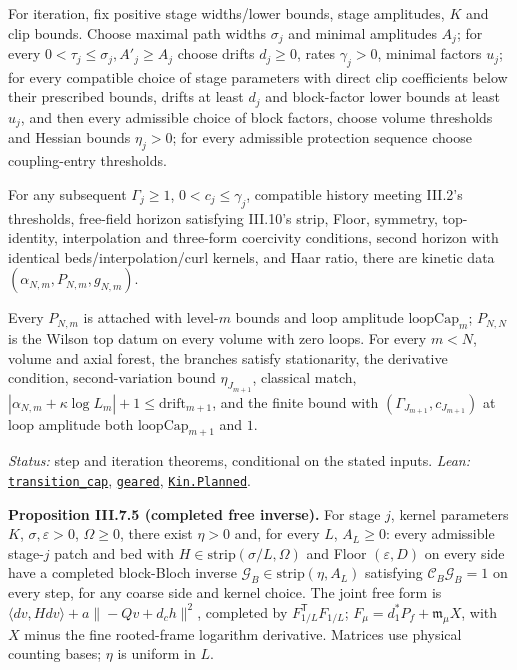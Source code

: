\documentclass[
  letterpaper,
  11pt]{article}
\begin{document}
For iteration, fix positive stage widths/lower bounds, stage amplitudes,
\(K\) and clip bounds. Choose maximal path widths \(\sigma_j\) and
minimal amplitudes \(A_j\); for every
\(0<\tau_j\le\sigma_j,A'_j\ge A_j\) choose drifts \(d_j\ge0\), rates
\(\gamma_j>0\), minimal factors \(u_j\); for every compatible choice of
stage parameters with direct clip coefficients below their prescribed
bounds, drifts at least \(d_j\) and block-factor lower bounds at least
\(u_j\), and then every admissible choice of block factors, choose
volume thresholds and Hessian bounds \(\eta_j>0\); for every admissible
protection sequence choose coupling-entry thresholds.

For any subsequent \(\Gamma_j\ge1\), \(0<c_j\le\gamma_j\), compatible
history meeting III.2's thresholds, free-field horizon satisfying
III.10's strip, Floor, symmetry, top-identity, interpolation and
three-form coercivity conditions, second horizon with identical
beds/interpolation/curl kernels, and Haar ratio, there are kinetic data
\((\alpha_{N,m},P_{N,m},g_{N,m})\).

Every \(P_{N,m}\) is attached with level-\(m\) bounds and loop amplitude
\(\mathrm{loopCap}_m\); \(P_{N,N}\) is the Wilson top datum on every
volume with zero loops. For every \(m<N\), volume and axial forest, the
branches satisfy stationarity, the derivative condition,
second-variation bound \(\eta_{J_{m+1}}\), classical match,
\(|\alpha_{N,m}+\kappa\log L_m|+1\le\mathrm{drift}_{m+1}\), and the
finite bound with \((\Gamma_{J_{m+1}},c_{J_{m+1}})\) at loop amplitude
both \(\mathrm{loopCap}_{m+1}\) and \(1\).

\emph{Status:} step and iteration theorems, conditional on the stated
inputs. \emph{Lean:}
\href{https://github.com/yang-mills-group/OpenAI-YM-20261028/blob/3456e5e75cf8d4cd558955a5c7638fba2d68f464/YM/Next/STATIONARY/Level/Transition.lean\#L92-L182}{\texttt{transition\_cap}},
\href{https://github.com/yang-mills-group/OpenAI-YM-20261028/blob/3456e5e75cf8d4cd558955a5c7638fba2d68f464/YM/Next/STATIONARY/FullPlanned.lean\#L59-L66}{\texttt{geared}},
\href{https://github.com/yang-mills-group/OpenAI-YM-20261028/blob/3456e5e75cf8d4cd558955a5c7638fba2d68f464/YM/PCalc/Loop.lean\#L93-L115}{\texttt{Kin.Planned}}.

\textbf{Proposition III.7.5 (completed free inverse).} For stage \(j\),
kernel parameters \(K\), \(\sigma,\varepsilon>0\), \(\Omega\ge0\), there
exist \(\eta>0\) and, for every \(L\), \(A_L\ge0\): every admissible
stage-\(j\) patch and bed with \(H\in\mathrm{strip}(\sigma/L,\Omega)\)
and Floor \((\varepsilon,D)\) on every side have a completed block-Bloch
inverse \(\mathcal G_B\in\mathrm{strip}(\eta,A_L)\) satisfying
\(\mathcal C_B\mathcal G_B=1\) on every step, for any coarse side and
kernel choice. The joint free form is
\(\langle dv,Hdv\rangle+a\|{-}Qv+d_ch\|^2\), completed by
\(F_{1/L}^{\mathsf T}F_{1/L}\);
\(F_\mu=d_{\!1}^*P_f+\mathfrak m_\mu X\), with \(X\) minus the fine
rooted-frame logarithm derivative. Matrices use physical counting bases;
\(\eta\) is uniform in \(L\).
\end{document}
